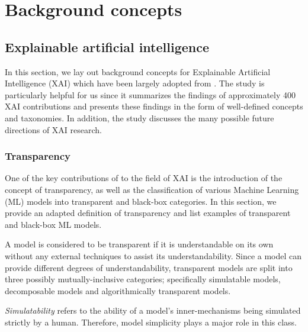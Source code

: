 \chapter{Background concepts}

\label{chapter:background}

\section{Explainable artificial intelligence}

\label{section:xai}

In this section, we lay out background concepts for Explainable Artificial Intelligence (XAI) which have been largely adopted from \citet{arrieta2020explainable}. The study is particularly helpful for us since it summarizes the findings of approximately 400 XAI contributions and presents these findings in the form of well-defined concepts and taxonomies. In addition, the study discusses the many possible future directions of XAI research.

\subsection{Transparency}

One of the key contributions of \citet{arrieta2020explainable} to the field of XAI is the introduction of the concept of transparency, as well as the classification of various Machine Learning (ML) models into transparent and black-box categories. In this section, we provide an adapted definition of transparency and list examples of transparent and black-box ML models. 

\begin{definition}
  A model is considered to be transparent if it is understandable on its own without any external techniques to assist its understandability. Since a model can provide different degrees of understandability, transparent models are split into three possibly mutually-inclusive categories; specifically simulatable models, decomposable models and algorithmically transparent models. 
\end{definition}

\begin{remark}
  \textit{Simulatability} refers to the ability of a model's inner-mechanisms being simulated strictly by a human. Therefore, model simplicity plays a major role in this class.
\end{remark}

